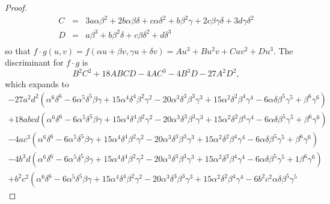 \documentclass[10pt]{amsart}
\begin{document}
\begin{thm}
\begin{proof}
\begin{eqnarray*}
        C &=& 3 a \alpha\beta^{2} 
        + 2 b \alpha \beta \delta 
        + c \alpha \delta^{2} 
        + b \beta^{2} \gamma 
        + 2 c \beta \gamma \delta
        + 3 d \gamma \delta^{2}\\
        D &=& a \beta^{3} 
        + b \beta^{2} \delta 
        + c \beta \delta^{2} 
        + d \delta^{3}\\
      \end{eqnarray*}
      so that $f \cdot g(u,v) = f(\alpha u + \beta v, \gamma u + \delta v) = Au^3 + Bu^2v + Cuv^2 + Du^3$.
      The discriminant for $f \cdot g$ is
      $$B^2C^2 + 18ABCD - 4AC^3 - 4B^3D - 27A^2D^2,$$ 
      which expands to
      \begin{eqnarray*}
        - 27 a^{2} d^{2}\left(\alpha^{6} \delta^{6} 
        - 6 \alpha^{5}\delta^{5} \beta\gamma 
        + 15 \alpha^{4}\delta^{4} \beta^{2}\gamma^{2} 
        - 20 \alpha^{3}\delta^{3} \beta^{3}\gamma^{3} 
        + 15 \alpha^{2}\delta^{2} \beta^{4}\gamma^{4} 
        - 6 \alpha\delta \beta^{5}\gamma^{5} 
        + \beta^{6} \gamma^{6}\right)\\
        + 18a b c d \left( \alpha^{6} \delta^{6} 
        - 6 \alpha^{5}\delta^{5} \beta\gamma 
        + 15 \alpha^{4}\delta^{4} \beta^{2}\gamma^{2} 
        - 20 \alpha^{3}\delta^{3} \beta^{3}\gamma^{3} 
        + 15 \alpha^{2}\delta^{2} \beta^{4}\gamma^{4} 
        - 6 \alpha\delta \beta^{5}\gamma^{5} 
        + \beta^{6}\gamma^{6}\right)\\
        - 4 a c^{3} \left( \alpha^{6}\delta^{6} 
        - 6 \alpha^{5}\delta^{5} \beta\gamma 
        + 15 \alpha^{4}\delta^{4} \beta^{2}\gamma^{2} 
        - 20 \alpha^{3}\delta^{3} \beta^{3}\gamma^{3} 
        + 15 \alpha^{2}\delta^{2} \beta^{4}\gamma^{4} 
        - 6 \alpha\delta \beta^{5}\gamma^{5} 
        + \beta^{6}\gamma^{6}\right)\\
        - 4b^{3} d \left(\alpha^{6} \delta^{6} 
        - 6 \alpha^{5}\delta^{5} \beta\gamma 
        + 15 \alpha^{4}\delta^{4} \beta^{2}\gamma^{2} 
        - 20 \alpha^{3}\delta^{3} \beta^{3}\gamma^{3} 
        + 15 \alpha^{2}\delta^{2} \beta^{4}\gamma^{4} 
        - 6 \alpha\delta \beta^{5}\gamma^{5} 
        + 1 \beta^{6}\gamma^{6}\right)\\
        + b^{2} c^{2} \left(\alpha^{6}\delta^{6} 
        - 6 \alpha^{5}\delta^{5} \beta\gamma 
        + 15 \alpha^{4}\delta^{4} \beta^{2}\gamma^{2} 
        - 20 \alpha^{3}\delta^{3} \beta^{3}\gamma^{3} 
        + 15 \alpha^{2}\delta^{2} \beta^{4}\gamma^{4} 
        - 6 b^{2} c^{2}\alpha\delta \beta^{5}\gamma^{5} 

\end{eqnarray*}
\end{proof}
\end{thm}
\end{document}
